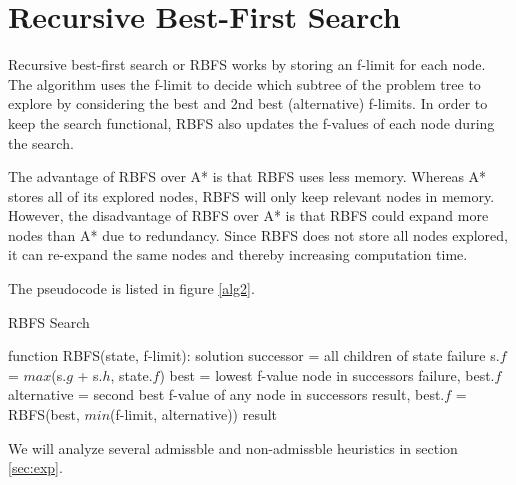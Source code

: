 \section{Recursive Best-First Search}

Recursive best-first search or RBFS works by storing an f-limit for each node. The algorithm uses the f-limit to decide which subtree of the problem tree to explore by considering the best and 2nd best (alternative) f-limits. In order to keep the search functional, RBFS also updates the f-values of each node during the search.

The advantage of RBFS over A* is that RBFS uses less memory. Whereas A* stores all of its explored nodes, RBFS will only keep relevant nodes in memory. However, the disadvantage of RBFS over A* is that RBFS could expand more nodes than A* due to redundancy. Since RBFS does not store all nodes explored, it can re-expand the same nodes and thereby increasing computation time.

The pseudocode is listed in figure \ref{alg2}.

\begin{algorithm}
\caption{RBFS Search}
\label{alg2}
\begin{algorithmic}
\STATE function RBFS(state, f-limit):
	\RETURN solution
\ENDIF
\STATE successor = all children of state
	\RETURN failure
\ELSE
		\STATE s.$f$ = $max$(s.$g$ + s.$h$, state.$f$)
	\ENDFOR
	\WHILE{\TRUE}
		\STATE best = lowest f-value node in successors
			\RETURN failure, best.$f$
		\ENDIF
		\STATE alternative = second best f-value of any node in successors
		\STATE result, best.$f$ = RBFS(best, $min$(f-limit, alternative))
			\RETURN result
		\ENDIF
	\ENDWHILE
\ENDIF
\end{algorithmic}
\end{algorithm}

We will analyze several admissble and non-admissble heuristics in section \ref{sec:exp}.

